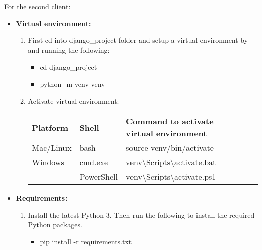 \documentclass{article}
\begin{document}
For the second client:
\begin{itemize}
    \item \textbf{Virtual environment: }

    \begin{enumerate}
        \item First cd into django\_project folder and setup a virtual environment by and running the following:

            
        \begin{itemize}
            \item cd django\_project
            \item  python -m venv venv
        \end{itemize}

        \item Activate virtual environment:   
        \begin{table}[h]
            \begin{tabular}{|l|l|l|ll}
            \cline{1-3}
            \textbf{Platform} & \textbf{Shell} & \textbf{Command to activate virtual environment}        &     &  \\ \cline{1-3}
            Mac/Linux         & bash           & source venv/bin/activate                                &  &  \\ \cline{1-3}
            Windows           & cmd.exe        & venv\textbackslash{}Scripts\textbackslash{}activate.bat &  &  \\ \cline{1-3}
                          & PowerShell     & venv\textbackslash{}Scripts\textbackslash{}activate.ps1 &  &  \\ \cline{1-3}
            \end{tabular}
        \end{table}
    \end{enumerate}                                           
            
    
    \item \textbf{Requirements: } 
    \begin{enumerate}
        \item Install the latest Python 3.
        Then run the following to install the required Python packages.
        
        \begin{itemize}
        \item pip install -r requirements.txt
        \end{itemize}

    \end{enumerate}
    

\end{itemize}
\end{document}
